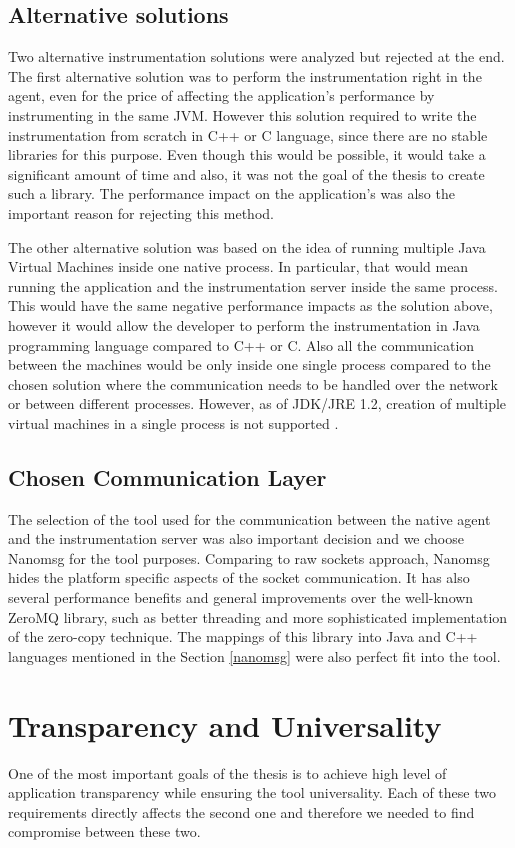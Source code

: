 \subsection{Alternative solutions}
Two alternative instrumentation solutions were analyzed but rejected at the end. The first alternative solution was to perform the instrumentation right in the agent, even for the price of affecting the application's performance by instrumenting in the same JVM. However this solution required to write the instrumentation from scratch in C++ or C language, since there are no stable libraries for this purpose. Even though this would be possible, it would take a significant amount of time and also, it was not the goal of the thesis to create such a library. The performance impact on the application's was also the important reason for rejecting this method.

The other alternative solution was based on the idea of running multiple Java Virtual Machines inside one native process. In particular, that would mean running the application and the instrumentation server inside the same process. This would have the same  negative performance impacts as the solution above, however it would allow the developer to perform the instrumentation in Java programming language compared to C++ or C. Also all the communication between the machines would be only inside one single process compared to the chosen solution where the communication needs to be handled over the network or between different processes. However, as of JDK/JRE 1.2, creation of multiple virtual machines in a single process is not supported \cite{MoreJVMOnceProccess}.
							
\subsection{Chosen Communication Layer}
The selection of the tool used for the communication between the native agent and the instrumentation server was also important decision and we choose Nanomsg for the tool purposes. Comparing to raw sockets approach, Nanomsg hides the platform specific aspects of the socket communication. It has also several performance benefits and general improvements over the well-known ZeroMQ library, such as better threading and more sophisticated implementation of the zero-copy technique. The mappings of this library into Java and C++ languages mentioned in the Section \ref{nanomsg} were also perfect fit into the tool.
		

\section{Transparency and Universality}
One of the most important goals of the thesis is to achieve high level of application transparency while ensuring the tool universality. Each of these two requirements directly affects the second one and therefore we needed to find compromise between these two.


